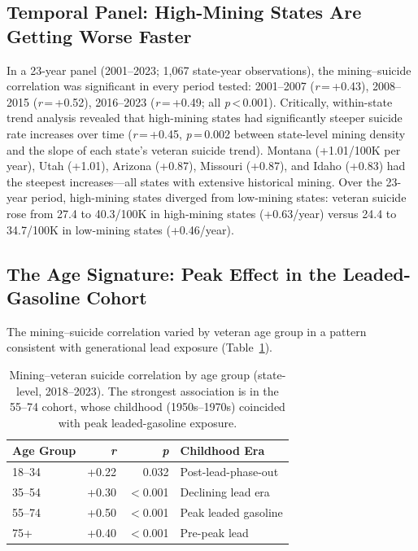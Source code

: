 \documentclass[11pt,twocolumn]{article}
\begin{document}
\subsection{Temporal Panel: High-Mining States Are Getting Worse Faster}

In a 23-year panel (2001--2023; 1,067 state-year observations), the mining--suicide correlation was significant in every period tested: 2001--2007 (\textit{r}\,=\,+0.43), 2008--2015 (\textit{r}\,=\,+0.52), 2016--2023 (\textit{r}\,=\,+0.49; all \textit{p}\,<\,0.001). Critically, within-state trend analysis revealed that high-mining states had significantly steeper suicide rate increases over time (\textit{r}\,=\,+0.45, \textit{p}\,=\,0.002 between state-level mining density and the slope of each state's veteran suicide trend). Montana (+1.01/100K per year), Utah (+1.01), Arizona (+0.87), Missouri (+0.87), and Idaho (+0.83) had the steepest increases---all states with extensive historical mining. Over the 23-year period, high-mining states diverged from low-mining states: veteran suicide rose from 27.4 to 40.3/100K in high-mining states (+0.63/year) versus 24.4 to 34.7/100K in low-mining states (+0.46/year).


\subsection{The Age Signature: Peak Effect in the Leaded-Gasoline Cohort}

The mining--suicide correlation varied by veteran age group in a pattern consistent with generational lead exposure (Table~\ref{tab:age}).

\begin{table}[H]
\centering
\small
\caption{Mining--veteran suicide correlation by age group (state-level, 2018--2023). The strongest association is in the 55--74 cohort, whose childhood (1950s--1970s) coincided with peak leaded-gasoline exposure.}
\label{tab:age}
\begin{tabular}{@{}lrrl@{}}
\toprule
\textbf{Age Group} & \textbf{\textit{r}} & \textbf{\textit{p}} & \textbf{Childhood Era} \\
\midrule
18--34 & +0.22 & 0.032 & Post-lead-phase-out \\
35--54 & +0.30 & $<$0.001 & Declining lead era \\
55--74 & +0.50 & $<$0.001 & Peak leaded gasoline \\
75+ & +0.40 & $<$0.001 & Pre-peak lead \\
\bottomrule
\end{tabular}
\end{table}
\end{document}
